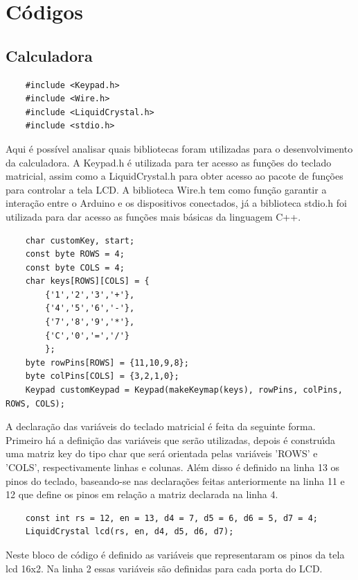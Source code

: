 \documentclass[conference]{IEEEtran}
\begin{document}
\section{Códigos}
    \subsection{Calculadora}
        \begin{lstlisting}  
    #include <Keypad.h>
    #include <Wire.h>
    #include <LiquidCrystal.h>
    #include <stdio.h>
        \end{lstlisting}
        Aqui é possível analisar quais bibliotecas foram utilizadas para o desenvolvimento da calculadora. 
        A Keypad.h é utilizada para ter acesso as funções do teclado
        matricial, assim como a LiquidCrystal.h para obter acesso ao
        pacote de funções para controlar a tela LCD. A biblioteca
        Wire.h tem como função garantir a interação entre o Arduino
        e os dispositivos conectados, já a biblioteca stdio.h foi utilizada
        para dar acesso as funções mais básicas da linguagem C++.
        \begin{lstlisting}  
    char customKey, start;
    const byte ROWS = 4;
    const byte COLS = 4;
    char keys[ROWS][COLS] = {
        {'1','2','3','+'},
        {'4','5','6','-'},
        {'7','8','9','*'},
        {'C','0','=','/'}
        };
    byte rowPins[ROWS] = {11,10,9,8};
    byte colPins[COLS] = {3,2,1,0};
    Keypad customKeypad = Keypad(makeKeymap(keys), rowPins, colPins, ROWS, COLS);
    \end{lstlisting}
          A declaração das variáveis do teclado matricial é feita da
      seguinte forma. Primeiro há a definição das variáveis que
      serão utilizadas, depois é construı́da uma matriz key do tipo
      char que será orientada pelas variáveis ’ROWS’ e ’COLS’,
      respectivamente linhas e colunas. Além disso é definido na
      linha 13 os pinos do teclado, baseando-se nas declarações
      feitas anteriormente na linha 11 e 12 que define os pinos em
      relação a matriz declarada na linha 4.

        \begin{lstlisting} 
    const int rs = 12, en = 13, d4 = 7, d5 = 6, d6 = 5, d7 = 4;
    LiquidCrystal lcd(rs, en, d4, d5, d6, d7);
        \end{lstlisting}
        Neste bloco de código é definido as variáveis que representaram os pinos da tela lcd 16x2.
        Na linha 2 essas variáveis são definidas para cada porta do LCD.
\end{document}
